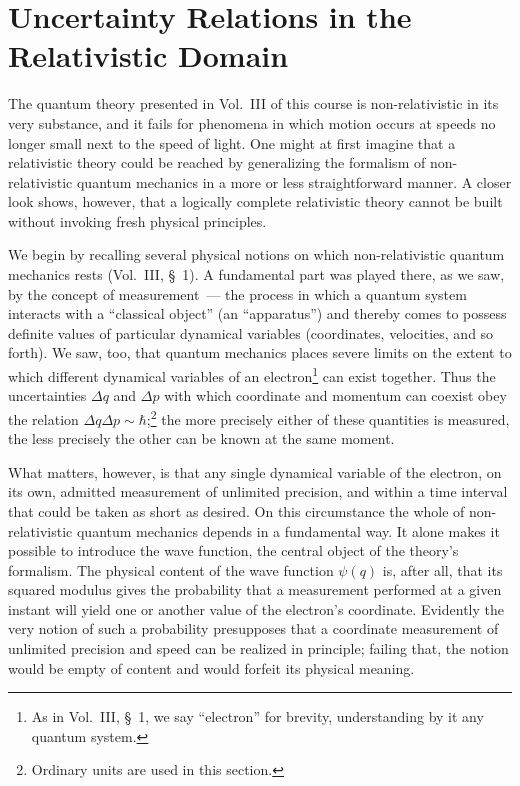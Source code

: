 \section{Uncertainty Relations in the Relativistic Domain}

The quantum theory presented in Vol.~III of this course is non-relativistic in its very substance, and it fails for phenomena in which motion occurs at speeds no longer small next to the speed of light. One might at first imagine that a relativistic theory could be reached by generalizing the formalism of non-relativistic quantum mechanics in a more or less straightforward manner. A closer look shows, however, that a logically complete relativistic theory cannot be built without invoking fresh physical principles.

We begin by recalling several physical notions on which non-relativistic quantum mechanics rests (Vol.~III, \S~1). A fundamental part was played there, as we saw, by the concept of measurement~--- the process in which a quantum system interacts with a ``classical object'' (an ``apparatus'') and thereby comes to possess definite values of particular dynamical variables (coordinates, velocities, and so forth). We saw, too, that quantum mechanics places severe limits on the extent to which different dynamical variables of an electron\footnote{As in Vol.~III, \S~1, we say ``electron'' for brevity, understanding by it any quantum system.} can exist together. Thus the uncertainties $\Delta q$ and $\Delta p$ with which coordinate and momentum can coexist obey the relation $\Delta q \Delta p \sim \hbar$;\footnote{Ordinary units are used in this section.} the more precisely either of these quantities is measured, the less precisely the other can be known at the same moment.

What matters, however, is that any single dynamical variable of the electron, on its own, admitted measurement of unlimited precision, and within a time interval that could be taken as short as desired. On this circumstance the whole of non-relativistic quantum mechanics depends in a fundamental way. It alone makes it possible to introduce the wave function, the central object of the theory's formalism. The physical content of the wave function $\psi(q)$ is, after all, that its squared modulus gives the probability that a measurement performed at a given instant will yield one or another value of the electron's coordinate. Evidently the very notion of such a probability presupposes that a coordinate measurement of unlimited precision and speed can be realized in principle; failing that, the notion would be empty of content and would forfeit its physical meaning.

